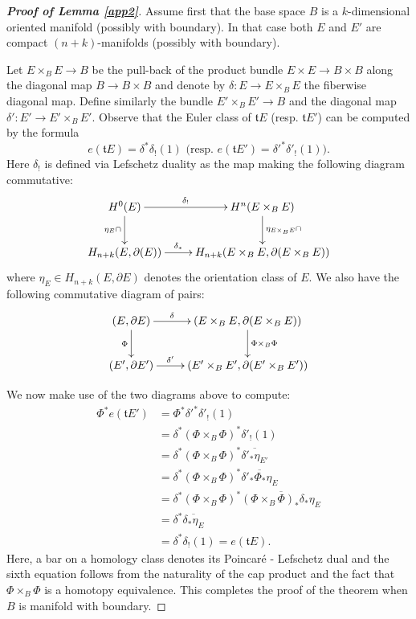 \documentclass[onecolumn,notitlepage,11pt]{article}
\newcommand{\beq}{\begin{equation*}}
\newcommand{\eeq}{\end{equation*}}
\theoremstyle{definition}
\begin{document}
\begin{proof}[\textbf{Proof of Lemma \ref{app2}}]
Assume first that the base space $B$ is a 
$k$-dimensional oriented
manifold (possibly with boundary). In that case
both $E$ and $E'$ are compact $(n+k)$-manifolds (possibly with boundary).

Let $E\times_B E\to B$ be the pull-back of 
the product bundle $E\times E\to B\times B$ along the diagonal map 
$B\to B\times B$ and denote by $\delta:E\to E\times_B E$ 
the fiberwise diagonal map. Define similarly the bundle
$E'\times_BE'\to B$ and the diagonal map $\delta':E'\to E'\times_BE'$.
Observe that the Euler class of $\mathfrak{t}E$ (resp. $\mathfrak{t}E'$)
can be computed by the formula
\beq
e(\mathfrak{t}E)=\delta^*\delta_!(1) \text{   (resp.   }
e(\mathfrak{t}E')=\delta'^*\delta'_!(1)).
\eeq
Here $\delta_!$ is defined via Lefschetz duality as the map making the
following diagram commutative:
\beq
\xymatrix{
H^0(E)\ar[r]^-{\delta_!}\ar[d]_{\eta_{E}\cap} & H^n(E\times_BE)\ar[d]^{\eta_{E\times_BE}\cap}\\
H_{n+k}(E,\partial(E))\ar[r]^-{\delta_*} 	  & H_{n+k}(E\times_BE,\partial(E\times_BE))
}
\eeq
where $\eta_E\in H_{n+k}(E,\partial E)$ denotes the orientation 
class of $E$.
We also have the following commutative diagram of pairs:
\beq
\xymatrix{
(E,\partial E)\ar[r]^-{\delta}\ar[d]_-{\Phi} & (E\times_BE,\partial (E\times_BE))\ar[d]^{\Phi\times_B\Phi}\\
(E',\partial E')\ar[r]^-{\delta'}		  & (E'\times_BE',\partial (E'\times_BE'))
}
\eeq

We now make use of the two diagrams above to compute:
\begin{align*}
\Phi^*e(\mathfrak{t}E')
			&=\Phi^*\delta'^*\delta'_!(1)\\
			&=\delta^*(\Phi\times_B\Phi)^*\delta'_!(1)\\
			&=\delta^*(\Phi\times_B\Phi)^*\overline{\delta'_*\eta_{E'}}\\
			&=\delta^*(\Phi\times_B\Phi)^*\overline{\delta'_*\Phi_*\eta_{E}}\\
			&=\delta^*(\Phi\times_B\Phi)^*\overline{(\Phi\times_B\Phi)_*\delta_*\eta_E}\\
			&=\delta^*\overline{\delta_*\eta_E}\\
			&=\delta^*\delta_!(1)=e(\mathfrak{t}E).
\end{align*}
Here, a bar on a homology
class denotes its Poincar\'e - Lefschetz dual and the sixth
equation follows from the naturality of the cap product and 
the fact that $\Phi\times_B\Phi$ is a homotopy equivalence. This completes
the proof of the theorem when $B$ is manifold with boundary.


\end{proof}
\end{document}
